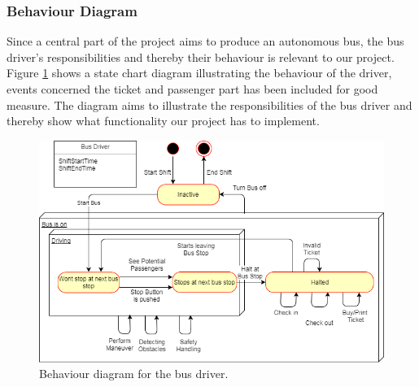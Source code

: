 \subsubsection{Behaviour Diagram}
Since a central part of the project aims to produce an autonomous bus, the bus driver's responsibilities and thereby their behaviour is relevant to our project. Figure \ref{BehaviorDiagramBusDriver} shows a state chart diagram illustrating the behaviour of the driver, events concerned the ticket and passenger part has been included for good measure. The diagram aims to illustrate the responsibilities of the bus driver and thereby show what functionality our project has to implement.

\begin{figure}[H]
\centering
\includegraphics[scale=0.6]{Images/BehaviorDiagramBusDriver.png}
\caption{Behaviour diagram for the bus driver.}
\label{BehaviorDiagramBusDriver}
\end{figure}

